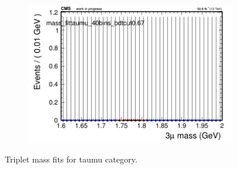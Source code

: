 \begin{figure}[H]
\begin{subfigure}{0.2\textwidth}
        \caption{}
    \end{subfigure}
    \begin{subfigure}{0.2\textwidth}
        \includegraphics[width=\textwidth]{flat_fit/plots/taumu/massfit_taumu_40bins_bdtcut0.67.png}
        \caption{}
    \end{subfigure}
    \caption{Triplet mass fits for taumu category.}
    \label{fig:flatfittaumu}
\end{figure}


